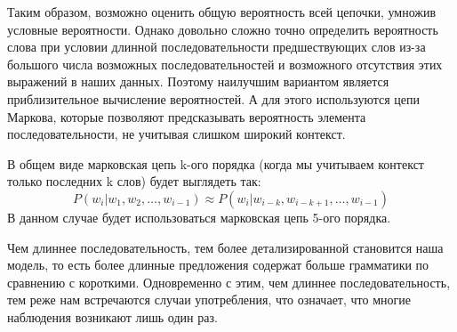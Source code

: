 Таким образом, возможно оценить общую вероятность всей цепочки, ум\-ножив условные вероятности. Однако довольно сложно точно определить вероятность слова при условии длинной последовательности предшествующих слов из-за большого числа возможных последовательностей и возможного отсутствия этих выражений в наших данных. Поэтому наилучшим вариантом является приблизительное вычисление вероятностей. А для этого используются цепи Маркова, которые позволяют предсказывать вероятность элемента последовательности, не учитывая слишком широкий контекст.

В общем виде марковская цепь k-ого порядка (когда мы учитываем контекст только последних k слов) будет выглядеть так:
\begin{equation}
    P(w_i|w_1,w_2,\ldots,w_{i-1}) \approx P(w_i|w_{i-k},w_{i-k+1},\ldots,w_{i-1})
\end{equation}
В данном случае будет использоваться марковская цепь 5-ого порядка.

Чем длиннее последовательность, тем более детализированной становится наша модель, то есть более длинные предложения содержат больше грамматики по сравнению с короткими. Одновременно с этим, чем длиннее последовательность, тем реже нам встречаются случаи употребления, что означает, что многие наблюдения возникают лишь один раз.
